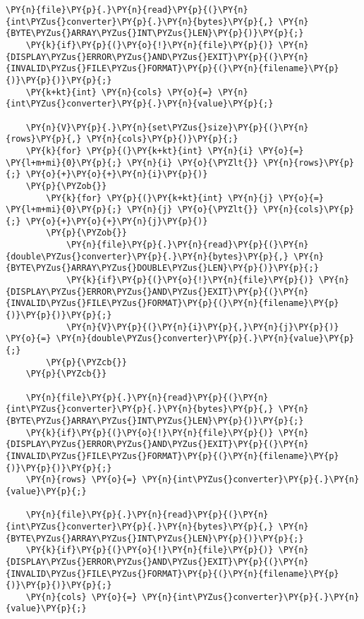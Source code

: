 \begin{Verbatim}[commandchars=\\\{\}]
    \PY{n}{file}\PY{p}{.}\PY{n}{read}\PY{p}{(}\PY{n}{int\PYZus{}converter}\PY{p}{.}\PY{n}{bytes}\PY{p}{,} \PY{n}{BYTE\PYZus{}ARRAY\PYZus{}INT\PYZus{}LEN}\PY{p}{)}\PY{p}{;}
    \PY{k}{if}\PY{p}{(}\PY{o}{!}\PY{n}{file}\PY{p}{)} \PY{n}{DISPLAY\PYZus{}ERROR\PYZus{}AND\PYZus{}EXIT}\PY{p}{(}\PY{n}{INVALID\PYZus{}FILE\PYZus{}FORMAT}\PY{p}{(}\PY{n}{filename}\PY{p}{)}\PY{p}{)}\PY{p}{;}
    \PY{k+kt}{int} \PY{n}{cols} \PY{o}{=} \PY{n}{int\PYZus{}converter}\PY{p}{.}\PY{n}{value}\PY{p}{;}

    \PY{n}{V}\PY{p}{.}\PY{n}{set\PYZus{}size}\PY{p}{(}\PY{n}{rows}\PY{p}{,} \PY{n}{cols}\PY{p}{)}\PY{p}{;}
    \PY{k}{for} \PY{p}{(}\PY{k+kt}{int} \PY{n}{i} \PY{o}{=} \PY{l+m+mi}{0}\PY{p}{;} \PY{n}{i} \PY{o}{\PYZlt{}} \PY{n}{rows}\PY{p}{;} \PY{o}{+}\PY{o}{+}\PY{n}{i}\PY{p}{)}
    \PY{p}{\PYZob{}}
    	\PY{k}{for} \PY{p}{(}\PY{k+kt}{int} \PY{n}{j} \PY{o}{=} \PY{l+m+mi}{0}\PY{p}{;} \PY{n}{j} \PY{o}{\PYZlt{}} \PY{n}{cols}\PY{p}{;} \PY{o}{+}\PY{o}{+}\PY{n}{j}\PY{p}{)}
    	\PY{p}{\PYZob{}}
    		\PY{n}{file}\PY{p}{.}\PY{n}{read}\PY{p}{(}\PY{n}{double\PYZus{}converter}\PY{p}{.}\PY{n}{bytes}\PY{p}{,} \PY{n}{BYTE\PYZus{}ARRAY\PYZus{}DOUBLE\PYZus{}LEN}\PY{p}{)}\PY{p}{;}
    		\PY{k}{if}\PY{p}{(}\PY{o}{!}\PY{n}{file}\PY{p}{)} \PY{n}{DISPLAY\PYZus{}ERROR\PYZus{}AND\PYZus{}EXIT}\PY{p}{(}\PY{n}{INVALID\PYZus{}FILE\PYZus{}FORMAT}\PY{p}{(}\PY{n}{filename}\PY{p}{)}\PY{p}{)}\PY{p}{;}
    		\PY{n}{V}\PY{p}{(}\PY{n}{i}\PY{p}{,}\PY{n}{j}\PY{p}{)} \PY{o}{=} \PY{n}{double\PYZus{}converter}\PY{p}{.}\PY{n}{value}\PY{p}{;}
    	\PY{p}{\PYZcb{}}
    \PY{p}{\PYZcb{}}

    \PY{n}{file}\PY{p}{.}\PY{n}{read}\PY{p}{(}\PY{n}{int\PYZus{}converter}\PY{p}{.}\PY{n}{bytes}\PY{p}{,} \PY{n}{BYTE\PYZus{}ARRAY\PYZus{}INT\PYZus{}LEN}\PY{p}{)}\PY{p}{;}
    \PY{k}{if}\PY{p}{(}\PY{o}{!}\PY{n}{file}\PY{p}{)} \PY{n}{DISPLAY\PYZus{}ERROR\PYZus{}AND\PYZus{}EXIT}\PY{p}{(}\PY{n}{INVALID\PYZus{}FILE\PYZus{}FORMAT}\PY{p}{(}\PY{n}{filename}\PY{p}{)}\PY{p}{)}\PY{p}{;}
    \PY{n}{rows} \PY{o}{=} \PY{n}{int\PYZus{}converter}\PY{p}{.}\PY{n}{value}\PY{p}{;}

    \PY{n}{file}\PY{p}{.}\PY{n}{read}\PY{p}{(}\PY{n}{int\PYZus{}converter}\PY{p}{.}\PY{n}{bytes}\PY{p}{,} \PY{n}{BYTE\PYZus{}ARRAY\PYZus{}INT\PYZus{}LEN}\PY{p}{)}\PY{p}{;}
    \PY{k}{if}\PY{p}{(}\PY{o}{!}\PY{n}{file}\PY{p}{)} \PY{n}{DISPLAY\PYZus{}ERROR\PYZus{}AND\PYZus{}EXIT}\PY{p}{(}\PY{n}{INVALID\PYZus{}FILE\PYZus{}FORMAT}\PY{p}{(}\PY{n}{filename}\PY{p}{)}\PY{p}{)}\PY{p}{;}
    \PY{n}{cols} \PY{o}{=} \PY{n}{int\PYZus{}converter}\PY{p}{.}\PY{n}{value}\PY{p}{;}


\end{Verbatim}
